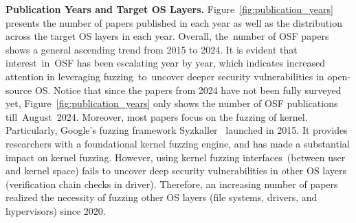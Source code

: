 

\textbf{Publication Years and Target OS Layers.}  Figure~\ref{fig:publication_years} presents the number of papers published in each year as well as the distribution across the target OS layers in each year. Overall, the~number of OSF papers shows a general ascending trend from 2015 to 2024. It is evident that interest~in~OSF has been escalating year by year, which indicates increased attention in leveraging fuzzing~to~uncover deeper security vulnerabilities in open-source OS. Notice that since the papers from 2024 have not been fully surveyed yet, Figure~\ref{fig:publication_years} only shows the number of OSF publications till~August~2024. Moreover, most papers focus on the fuzzing of kernel. Particularly, Google’s fuzzing framework Syzkaller~\cite{Syzkaller} launched in 2015. It provides researchers with a foundational kernel fuzzing engine, and has made a substantial impact on kernel fuzzing. However, using kernel fuzzing interfaces~(\ie between user and kernel space) fails to uncover deep security vulnerabilities in other OS layers (\eg verification chain checks in driver). Therefore, an increasing number of papers realized the necessity of fuzzing other OS layers (\ie file systems, drivers, and hypervisors) since 2020.

